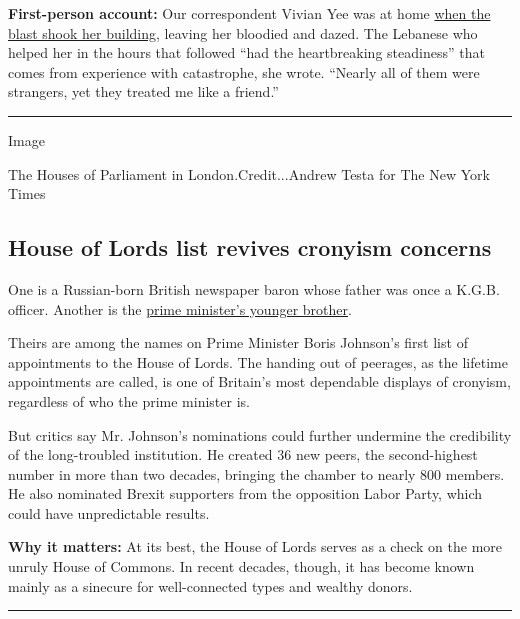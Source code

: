 \textbf{First-person account:} Our correspondent Vivian Yee was at home
\href{https://www.nytimes3xbfgragh.onion/2020/08/04/world/middleeast/lebanon-explosion-beirut.html}{when
the blast shook her building}, leaving her bloodied and dazed. The
Lebanese who helped her in the hours that followed ``had the
heartbreaking steadiness'' that comes from experience with catastrophe,
she wrote. ``Nearly all of them were strangers, yet they treated me like
a friend.''

\begin{center}\rule{0.5\linewidth}{\linethickness}\end{center}

Image

The Houses of Parliament in London.Credit...Andrew Testa for The New
York Times

\hypertarget{house-of-lords-list-revives-cronyism-concerns}{%
\subsection{House of Lords list revives cronyism
concerns}\label{house-of-lords-list-revives-cronyism-concerns}}

One is a Russian-born British newspaper baron whose father was once a
K.G.B. officer. Another is the
\href{https://www.nytimes3xbfgragh.onion/2020/08/04/world/house-of-lords-boris-johnson.html}{prime
minister's younger brother}.

Theirs are among the names on Prime Minister Boris Johnson's first list
of appointments to the House of Lords. The handing out of peerages, as
the lifetime appointments are called, is one of Britain's most
dependable displays of cronyism, regardless of who the prime minister
is.

But critics say Mr. Johnson's nominations could further undermine the
credibility of the long-troubled institution. He created 36 new peers,
the second-highest number in more than two decades, bringing the chamber
to nearly 800 members. He also nominated Brexit supporters from the
opposition Labor Party, which could have unpredictable results.

\textbf{Why it matters:} At its best, the House of Lords serves as a
check on the more unruly House of Commons. In recent decades, though, it
has become known mainly as a sinecure for well-connected types and
wealthy donors.

\begin{center}\rule{0.5\linewidth}{\linethickness}\end{center}

